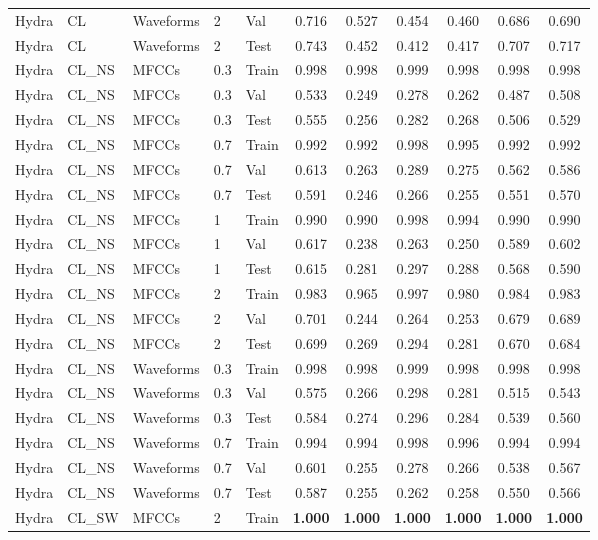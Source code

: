 \begin{landscape}
\begin{longtable}{|l|l|l|l|l|c|c|c|c|c|c|}
Hydra & CL & Waveforms & 2 & Val & 0.716 & 0.527 & 0.454 & 0.460 & 0.686 & 0.690 \\
Hydra & CL & Waveforms & 2 & Test & 0.743 & 0.452 & 0.412 & 0.417 & 0.707 & 0.717 \\
Hydra & CL\_NS & MFCCs & 0.3 & Train & 0.998 & 0.998 & 0.999 & 0.998 & 0.998 & 0.998 \\
Hydra & CL\_NS & MFCCs & 0.3 & Val & 0.533 & 0.249 & 0.278 & 0.262 & 0.487 & 0.508 \\
Hydra & CL\_NS & MFCCs & 0.3 & Test & 0.555 & 0.256 & 0.282 & 0.268 & 0.506 & 0.529 \\
Hydra & CL\_NS & MFCCs & 0.7 & Train & 0.992 & 0.992 & 0.998 & 0.995 & 0.992 & 0.992 \\
Hydra & CL\_NS & MFCCs & 0.7 & Val & 0.613 & 0.263 & 0.289 & 0.275 & 0.562 & 0.586 \\
Hydra & CL\_NS & MFCCs & 0.7 & Test & 0.591 & 0.246 & 0.266 & 0.255 & 0.551 & 0.570 \\
Hydra & CL\_NS & MFCCs & 1 & Train & 0.990 & 0.990 & 0.998 & 0.994 & 0.990 & 0.990 \\
Hydra & CL\_NS & MFCCs & 1 & Val & 0.617 & 0.238 & 0.263 & 0.250 & 0.589 & 0.602 \\
Hydra & CL\_NS & MFCCs & 1 & Test & 0.615 & 0.281 & 0.297 & 0.288 & 0.568 & 0.590 \\
Hydra & CL\_NS & MFCCs & 2 & Train & 0.983 & 0.965 & 0.997 & 0.980 & 0.984 & 0.983 \\
Hydra & CL\_NS & MFCCs & 2 & Val & 0.701 & 0.244 & 0.264 & 0.253 & 0.679 & 0.689 \\
Hydra & CL\_NS & MFCCs & 2 & Test & 0.699 & 0.269 & 0.294 & 0.281 & 0.670 & 0.684 \\
Hydra & CL\_NS & Waveforms & 0.3 & Train & 0.998 & 0.998 & 0.999 & 0.998 & 0.998 & 0.998 \\
Hydra & CL\_NS & Waveforms & 0.3 & Val & 0.575 & 0.266 & 0.298 & 0.281 & 0.515 & 0.543 \\
Hydra & CL\_NS & Waveforms & 0.3 & Test & 0.584 & 0.274 & 0.296 & 0.284 & 0.539 & 0.560 \\
Hydra & CL\_NS & Waveforms & 0.7 & Train & 0.994 & 0.994 & 0.998 & 0.996 & 0.994 & 0.994 \\
Hydra & CL\_NS & Waveforms & 0.7 & Val & 0.601 & 0.255 & 0.278 & 0.266 & 0.538 & 0.567 \\
Hydra & CL\_NS & Waveforms & 0.7 & Test & 0.587 & 0.255 & 0.262 & 0.258 & 0.550 & 0.566 \\
Hydra & CL\_SW & MFCCs & 2 & Train & \textbf{1.000} & \textbf{1.000} & \textbf{1.000} & \textbf{1.000} & \textbf{1.000} & \textbf{1.000} \\

\end{longtable}
\end{landscape}
